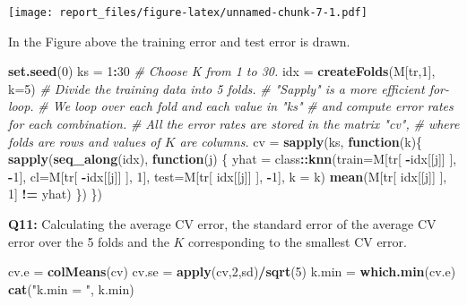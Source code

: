 \documentclass[]{article}
\newenvironment{Shaded}{\begin{snugshade}}{\end{snugshade}}
\newcommand{\KeywordTok}[1]{\textcolor[rgb]{0.13,0.29,0.53}{\textbf{#1}}}
\newcommand{\DataTypeTok}[1]{\textcolor[rgb]{0.13,0.29,0.53}{#1}}
\newcommand{\DecValTok}[1]{\textcolor[rgb]{0.00,0.00,0.81}{#1}}
\newcommand{\StringTok}[1]{\textcolor[rgb]{0.31,0.60,0.02}{#1}}
\newcommand{\CommentTok}[1]{\textcolor[rgb]{0.56,0.35,0.01}{\textit{#1}}}
\newcommand{\ControlFlowTok}[1]{\textcolor[rgb]{0.13,0.29,0.53}{\textbf{#1}}}
\newcommand{\OperatorTok}[1]{\textcolor[rgb]{0.81,0.36,0.00}{\textbf{#1}}}
\newcommand{\NormalTok}[1]{#1}
\begin{document}
\texttt{[image: report\_files/figure-latex/unnamed-chunk-7-1.pdf]}

In the Figure above the training error and test error is drawn.

\begin{Shaded}
\begin{Highlighting}[]
\KeywordTok{set.seed}\NormalTok{(}\DecValTok{0}\NormalTok{)}
\NormalTok{ks =}\StringTok{ }\DecValTok{1}\OperatorTok{:}\DecValTok{30} \CommentTok{# Choose K from 1 to 30.}
\NormalTok{idx =}\StringTok{ }\KeywordTok{createFolds}\NormalTok{(M[tr,}\DecValTok{1}\NormalTok{], }\DataTypeTok{k=}\DecValTok{5}\NormalTok{) }\CommentTok{# Divide the training data into 5 folds.}
\CommentTok{# "Sapply" is a more efficient for-loop. }
\CommentTok{# We loop over each fold and each value in "ks"}
\CommentTok{# and compute error rates for each combination.}
\CommentTok{# All the error rates are stored in the matrix "cv", }
\CommentTok{# where folds are rows and values of $K$ are columns.}
\NormalTok{cv =}\StringTok{ }\KeywordTok{sapply}\NormalTok{(ks, }\ControlFlowTok{function}\NormalTok{(k)\{ }
  \KeywordTok{sapply}\NormalTok{(}\KeywordTok{seq_along}\NormalTok{(idx), }\ControlFlowTok{function}\NormalTok{(j) \{}
\NormalTok{    yhat =}\StringTok{ }\NormalTok{class}\OperatorTok{::}\KeywordTok{knn}\NormalTok{(}\DataTypeTok{train=}\NormalTok{M[tr[ }\OperatorTok{-}\NormalTok{idx[[j]] ], }\OperatorTok{-}\DecValTok{1}\NormalTok{],}
               \DataTypeTok{cl=}\NormalTok{M[tr[ }\OperatorTok{-}\NormalTok{idx[[j]] ], }\DecValTok{1}\NormalTok{],}
               \DataTypeTok{test=}\NormalTok{M[tr[ idx[[j]] ], }\OperatorTok{-}\DecValTok{1}\NormalTok{], }\DataTypeTok{k =}\NormalTok{ k)}
    \KeywordTok{mean}\NormalTok{(M[tr[ idx[[j]] ], }\DecValTok{1}\NormalTok{] }\OperatorTok{!=}\StringTok{ }\NormalTok{yhat)}
\NormalTok{  \})}
\NormalTok{\})}
\end{Highlighting}
\end{Shaded}

\textbf{Q11:} Calculating the average CV error, the standard error of
the average CV error over the 5 folds and the \(K\) corresponding to the
smallest CV error.

\begin{Shaded}
\begin{Highlighting}[]
\NormalTok{cv.e =}\StringTok{ }\KeywordTok{colMeans}\NormalTok{(cv)}
\NormalTok{cv.se =}\StringTok{ }\KeywordTok{apply}\NormalTok{(cv,}\DecValTok{2}\NormalTok{,sd)}\OperatorTok{/}\KeywordTok{sqrt}\NormalTok{(}\DecValTok{5}\NormalTok{)}
\NormalTok{k.min =}\StringTok{ }\KeywordTok{which.min}\NormalTok{(cv.e)}
\KeywordTok{cat}\NormalTok{(}\StringTok{"k.min = "}\NormalTok{, k.min)}
\end{Highlighting}
\end{Shaded}
\end{document}
